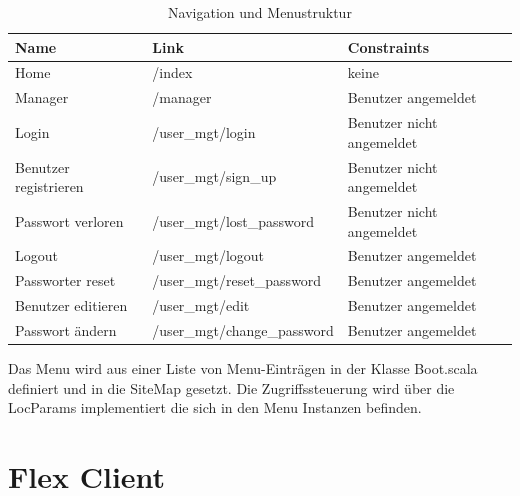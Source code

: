 \begin{spacing}{0.5}
  \begin{longtable}{|p{2cm}|p{5cm}|p{6cm}|}
      \caption{Navigation und Menustruktur}\\
\hline
  \textbf{Name} & \textbf{Link} & \textbf{Constraints}\\
  \hline
  Home & /index & keine\\
  \hline
  Manager & /manager & Benutzer angemeldet\\
  \hline
  Login & /user\_mgt/login & Benutzer nicht angemeldet\\
  \hline
  Benutzer registrieren & /user\_mgt/sign\_up & Benutzer nicht angemeldet\\
  \hline
  Passwort verloren & /user\_mgt/lost\_password & Benutzer nicht angemeldet\\
  \hline
  Logout & /user\_mgt/logout & Benutzer angemeldet\\
  \hline
 Passworter reset & /user\_mgt/reset\_password & Benutzer angemeldet\\
  \hline
  Benutzer editieren & /user\_mgt/edit & Benutzer angemeldet\\
  \hline
  Passwort \"andern & /user\_mgt/change\_password & Benutzer angemeldet\\
  \hline
  \end{longtable}
\end{spacing}

Das Menu wird aus einer Liste von Menu-Eintr\"agen in der Klasse Boot.scala definiert und in die SiteMap gesetzt. Die Zugriffssteuerung wird \"uber die LocParams implementiert die sich in den Menu Instanzen befinden. 
 
\section{Flex Client}
